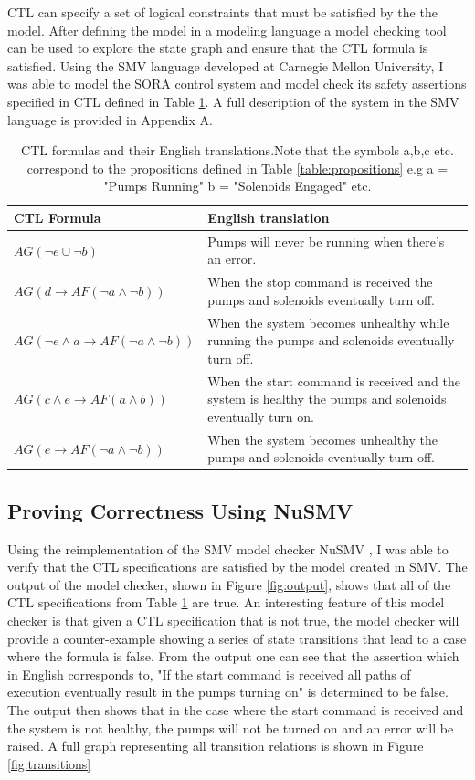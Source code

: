 \documentclass{article}
\begin{document}
CTL can specify a set of logical constraints that must be satisfied by the the model. After defining the model in a modeling language a model checking tool can be used to explore the state graph and ensure that the CTL formula is satisfied. Using the SMV language \cite{smv} developed at Carnegie Mellon University, I was able to model the SORA control system and model check its safety assertions specified in CTL defined in Table \ref{table:logic}. A full description of the system in the SMV language is provided in Appendix A.
\begin{table}[H]
\begin{center}
\begin{tabular}{ |l|p{12cm}|}
\hline
\textbf{CTL Formula} & \textbf{English translation} \\
\hline
$AG(\neg e \cup \neg b)$ & Pumps will never be running when there's an error. \\
\hline
$AG(d \rightarrow AF(\neg a \wedge \neg b))$ & When the stop command is  received the pumps and solenoids eventually turn off.\\
\hline
$AG(\neg e \wedge a \rightarrow AF(\neg a \wedge \neg b))$ & When the system becomes unhealthy while running the pumps and solenoids eventually turn off.\\
\hline
$AG(c \wedge e\rightarrow AF(a \wedge b))$ & When the start command is received and the system is healthy the pumps and solenoids eventually turn on.\\
\hline
$AG(e \rightarrow AF(\neg a \wedge \neg b))$ & When the system becomes unhealthy the pumps and solenoids eventually turn off.\\
\hline

\end{tabular}
\caption{CTL formulas and their English translations.Note that the symbols a,b,c etc. correspond to the propositions defined in Table \ref{table:propositions} e.g a = "Pumps Running" b = "Solenoids Engaged" etc.}
\label{table:logic}
\end{center}
\end{table}
\subsection{Proving Correctness Using NuSMV}
Using the reimplementation of the SMV model checker NuSMV \cite{smv}, I was able to verify that the CTL specifications are satisfied by the model created in SMV. The output of the model checker, shown in Figure \ref{fig:output}, shows that all of the CTL specifications from Table \ref{table:logic} are true. An interesting feature of this model checker is that given a CTL specification that is not true, the model checker will provide a counter-example showing a series of state transitions that lead to a case where the formula is false. From the output one can see that the assertion which in English corresponds to, "If the start command is received all paths of execution eventually result in the pumps turning on" is determined to be false. The output then shows that in the case where the start command is received and the system is not healthy, the pumps will not be turned on and an error will be raised. A full graph representing all transition relations is shown in Figure \ref{fig:transitions}
\end{document}
